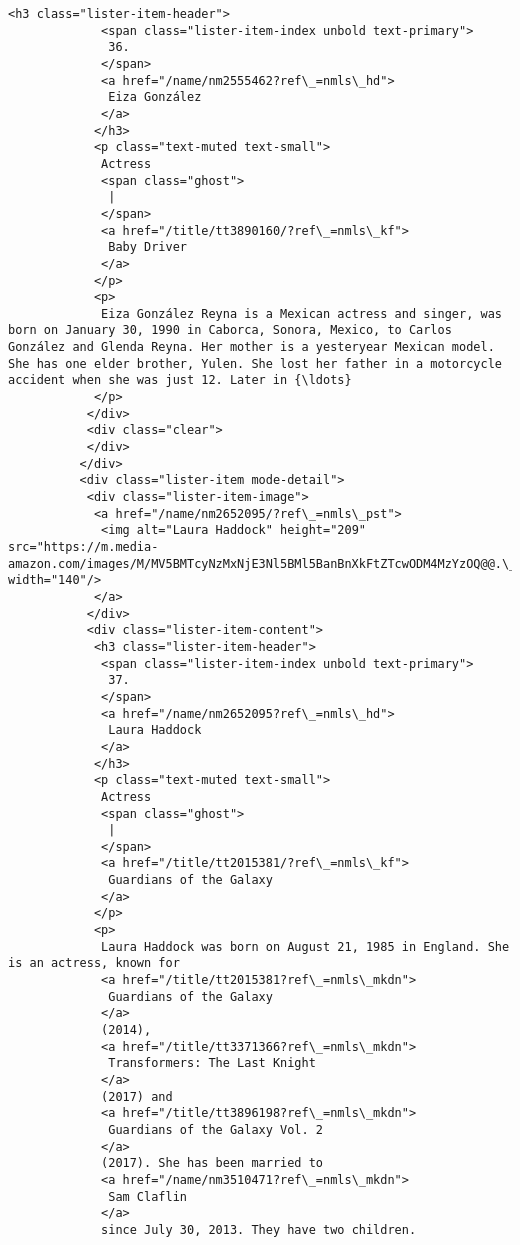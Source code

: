 \documentclass[11pt]{article}
\begin{document}
\begin{Verbatim}[commandchars=\\\{\}]
            <h3 class="lister-item-header">
             <span class="lister-item-index unbold text-primary">
              36.
             </span>
             <a href="/name/nm2555462?ref\_=nmls\_hd">
              Eiza González
             </a>
            </h3>
            <p class="text-muted text-small">
             Actress
             <span class="ghost">
              |
             </span>
             <a href="/title/tt3890160/?ref\_=nmls\_kf">
              Baby Driver
             </a>
            </p>
            <p>
             Eiza González Reyna is a Mexican actress and singer, was born on January 30, 1990 in Caborca, Sonora, Mexico, to Carlos González and Glenda Reyna. Her mother is a yesteryear Mexican model. She has one elder brother, Yulen. She lost her father in a motorcycle accident when she was just 12. Later in {\ldots}
            </p>
           </div>
           <div class="clear">
           </div>
          </div>
          <div class="lister-item mode-detail">
           <div class="lister-item-image">
            <a href="/name/nm2652095/?ref\_=nmls\_pst">
             <img alt="Laura Haddock" height="209" src="https://m.media-amazon.com/images/M/MV5BMTcyNzMxNjE3Nl5BMl5BanBnXkFtZTcwODM4MzYzOQ@@.\_V1\_UX140\_CR0,0,140,209\_AL\_.jpg" width="140"/>
            </a>
           </div>
           <div class="lister-item-content">
            <h3 class="lister-item-header">
             <span class="lister-item-index unbold text-primary">
              37.
             </span>
             <a href="/name/nm2652095?ref\_=nmls\_hd">
              Laura Haddock
             </a>
            </h3>
            <p class="text-muted text-small">
             Actress
             <span class="ghost">
              |
             </span>
             <a href="/title/tt2015381/?ref\_=nmls\_kf">
              Guardians of the Galaxy
             </a>
            </p>
            <p>
             Laura Haddock was born on August 21, 1985 in England. She is an actress, known for
             <a href="/title/tt2015381?ref\_=nmls\_mkdn">
              Guardians of the Galaxy
             </a>
             (2014),
             <a href="/title/tt3371366?ref\_=nmls\_mkdn">
              Transformers: The Last Knight
             </a>
             (2017) and
             <a href="/title/tt3896198?ref\_=nmls\_mkdn">
              Guardians of the Galaxy Vol. 2
             </a>
             (2017). She has been married to
             <a href="/name/nm3510471?ref\_=nmls\_mkdn">
              Sam Claflin
             </a>
             since July 30, 2013. They have two children.

\end{Verbatim}
\end{document}
